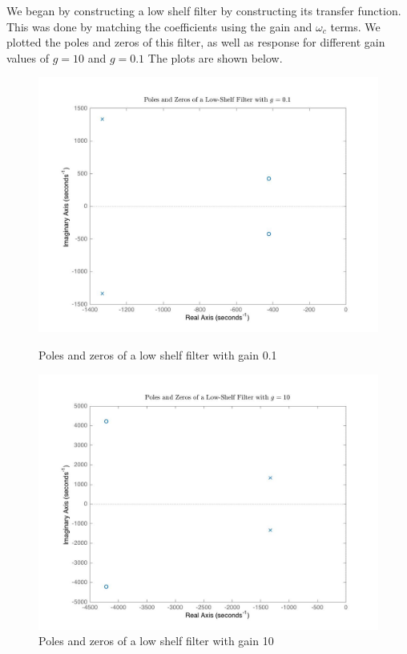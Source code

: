 \documentclass{article}
\begin{document}
We began by constructing a low shelf filter by constructing its transfer function. This was done by matching the coefficients using the gain and $\omega _c$ terms. We plotted the poles and zeros of this filter, as well as  response for different gain values of $g=10$ and $g= 0.1$ The plots are shown below. 


\begin{figure}[!htb]
    \centering
    \begin{minipage}{.5\textwidth}
        \centering
        \includegraphics[width=1.0\linewidth, height=0.2\textheight]{lowshelfpoles.jpg}
        \caption{Poles and zeros of a low shelf filter with gain 0.1}
    \end{minipage}
        \begin{minipage}{.5\textwidth}
        \centering
        \includegraphics[width=1.0\linewidth, height=0.2\textheight]{lowshelfpoles10.jpg}
        \caption{Poles and zeros of a low shelf filter with gain 10}
    \end{minipage}
    \end{figure}
    
\end{document}
